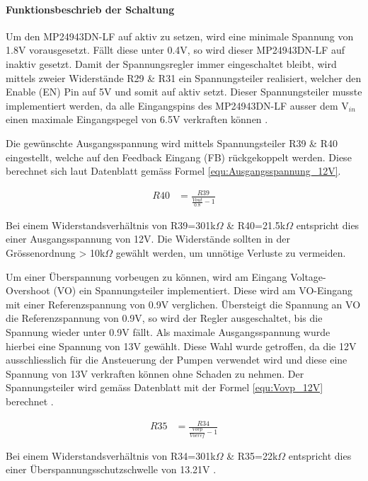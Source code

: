 \paragraph{Funktionsbeschrieb der Schaltung}\mbox{}

Um den MP24943DN-LF auf aktiv zu setzen, wird eine minimale Spannung von 1.8V vorausgesetzt. Fällt diese unter 0.4V, so wird dieser MP24943DN-LF auf inaktiv gesetzt. Damit der Spannungsregler immer eingeschaltet bleibt, wird mittels zweier Widerstände R29 \& R31 ein Spannungsteiler realisiert, welcher den Enable (EN) Pin auf 5V und somit auf aktiv setzt. Dieser Spannungsteiler musste implementiert werden, da alle Eingangspins des MP24943DN-LF ausser dem V$_{in}$ einen maximale Eingangspegel von 6.5V verkraften können \cite[S.3]{monolithic_power_systems_mp24943_2011}. 

Die gewünschte Ausgangsspannung wird mittels Spannungsteiler R39 \& R40 eingestellt, welche auf den Feedback Eingang (FB) rückgekoppelt werden. Diese berechnet sich laut Datenblatt gemäss Formel \ref{equ:Ausgangsspannung_12V}.

\begin{align}
R40 &= \frac{R39}{\frac{Vout}{0.8}-1}
\label{equ:Ausgangsspannung_12V}
\end{align}

Bei einem Widerstandsverhältnis von R39=301k$\Omega$ \& R40=21.5k$\Omega$ entspricht dies einer Ausgangsspannung von 12V. Die Widerstände sollten in der Grössenordnung > 10k$\Omega$ gewählt werden, um unnötige Verluste zu vermeiden.  

Um einer Überspannung vorbeugen zu können, wird am Eingang Voltage-Overshoot (VO) ein Spannungsteiler implementiert. Diese wird am VO-Eingang mit einer Referenzspannung von 0.9V verglichen. Übersteigt die Spannung an VO die Referenzspannung von 0.9V, so wird der Regler ausgeschaltet, bis die Spannung wieder unter 0.9V fällt. Als maximale Ausgangsspannung wurde hierbei eine Spannung von 13V gewählt. Diese Wahl wurde getroffen, da die 12V ausschliesslich für die Ansteuerung der Pumpen verwendet wird und diese eine Spannung von 13V verkraften können ohne Schaden zu nehmen. Der Spannungsteiler wird gemäss Datenblatt mit der Formel \ref{equ:Vovp_12V} berechnet  \cite{aiyimaindustrial_store_us_nodate}.

\begin{align}
R35 &= \frac{R34}{\frac{Vovp}{Vovref}-1}
\label{equ:Vovp_12V}
\end{align}

Bei einem Widerstandsverhältnis von R34=301k$\Omega$ \& R35=22k$\Omega$ entspricht dies einer Überspannungsschutzschwelle von 13.21V  \cite{mouser_mp24943dn-lf_nodate}.

